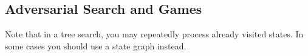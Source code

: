 
\subsection{Adversarial Search and Games}

Note that in a tree search, you may repeatedly process already visited states. In some cases you should use a state graph instead.

